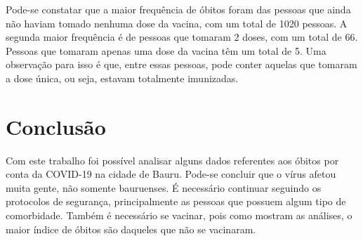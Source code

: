 \documentclass[
]{article}
\begin{document}
Pode-se constatar que a maior frequência de óbitos foram das pessoas que
ainda não haviam tomado nenhuma dose da vacina, com um total de 1020
pessoas. A segunda maior frequência é de pessoas que tomaram 2 doses,
com um total de 66. Pessoas que tomaram apenas uma dose da vacina têm um
total de 5. Uma observação para isso é que, entre essas pessoas, pode
conter aquelas que tomaram a dose única, ou seja, estavam totalmente
imunizadas.

\hypertarget{conclusuxe3o}{%
\section{Conclusão}\label{conclusuxe3o}}

Com este trabalho foi possível analisar alguns dados referentes aos
óbitos por conta da COVID-19 na cidade de Bauru. Pode-se concluir que o
vírus afetou muita gente, não somente bauruenses. É necessário continuar
seguindo os protocolos de segurança, principalmente as pessoas que
possuem algum tipo de comorbidade. Também é necessário se vacinar, pois
como mostram as análises, o maior índice de óbitos são daqueles que não
se vacinaram.
\end{document}
